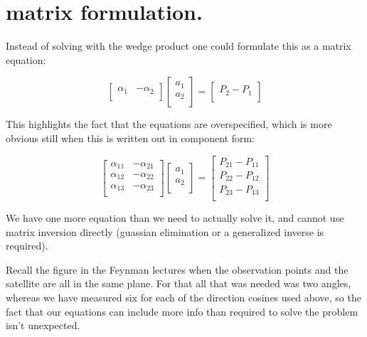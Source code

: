 \documentclass{article}      %
\begin{document}
\section{ matrix formulation. }

Instead of solving with the wedge product one could formulate this as a matrix equation:

\begin{equation}\label{eqn:twopointsmatrix}
\begin{bmatrix}
\alpha_1 & -\alpha_2 \\
\end{bmatrix}
\begin{bmatrix}
a_1 \\
a_2 \\
\end{bmatrix}
= 
\begin{bmatrix}
P_2 - P_1 \\
\end{bmatrix}
\end{equation}

This highlights the fact that the equations are overspecified, which is more obvious still when this is written out in component form:

\begin{equation}
\begin{bmatrix}
\alpha_{11} & -\alpha_{21} \\
\alpha_{12} & -\alpha_{22} \\
\alpha_{13} & -\alpha_{23} \\
\end{bmatrix}
\begin{bmatrix}
a_1 \\
a_2 \\
\end{bmatrix}
=
\begin{bmatrix}
P_{21} - P_{11} \\
P_{22} - P_{12} \\
P_{23} - P_{13} \\
\end{bmatrix}
\end{equation}

We have one more equation than we need to actually solve it, and cannot use matrix inversion directly (guassian elimination or a generalized inverse is required).

Recall the figure in the Feynman lectures when the observation points and the satellite are all in the same plane.  For that all that was needed was two angles, whereas we have measured six for each of the direction cosines used above, so the fact that our equations can include more info than required to solve the problem isn't unexpected.
\end{document}
